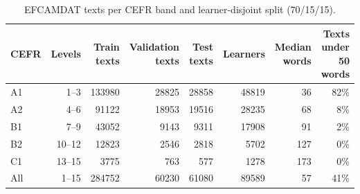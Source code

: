 
\begin{table}[t]
\centering
\small
\begin{tabular}{lrrrrrrr}
\toprule
CEFR & Levels & Train texts & Validation texts & Test texts & Learners & Median words & Texts under 50 words \\
\midrule
A1 & 1–3 & 133980 & 28825 & 28858 & 48819 & 36 & 82\% \\
A2 & 4–6 & 91122 & 18953 & 19516 & 28235 & 68 & 8\% \\
B1 & 7–9 & 43052 & 9143 & 9311 & 17908 & 91 & 2\% \\
B2 & 10–12 & 12823 & 2546 & 2818 & 5702 & 127 & 0\% \\
C1 & 13–15 & 3775 & 763 & 577 & 1278 & 173 & 0\% \\
All & 1–15 & 284752 & 60230 & 61080 & 89589 & 57 & 41\% \\
\bottomrule
\end{tabular}
\caption{EFCAMDAT texts per CEFR band and learner-disjoint split (70/15/15).}
\label{tab:table_1_data}
\end{table}

